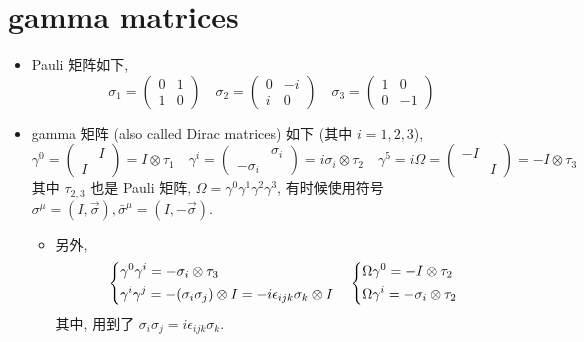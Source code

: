 \section{gamma matrices}
\begin{itemize}
	\item Pauli 矩阵如下,
	\begin{equation}
		\sigma_1 = \begin{pmatrix}
			0 & 1 \\
			1 & 0
		\end{pmatrix} \quad \sigma_2 = \begin{pmatrix}
			0 & - i \\
			i & 0
		\end{pmatrix} \quad \sigma_3 = \begin{pmatrix}
			1 & 0 \\
			0 & - 1
		\end{pmatrix}
	\end{equation}
	
	\item gamma 矩阵 (also called Dirac matrices) 如下 (其中 $i = 1, 2, 3$),
	\begin{equation}
		\gamma^0 = \begin{pmatrix}
			& I \\
			I &
		\end{pmatrix} = I \otimes \tau_1 \quad \gamma^i = \begin{pmatrix}
			& \sigma_i \\
			- \sigma_i &
		\end{pmatrix} = i \sigma_i \otimes \tau_2 \quad \gamma^5 = i \Omega = \begin{pmatrix}
			- I & \\
			& I
		\end{pmatrix} = - I \otimes \tau_3
	\end{equation}
	其中 $\tau_{2, 3}$ 也是 Pauli 矩阵, $\Omega = \gamma^0 \gamma^1 \gamma^2 \gamma^3$, 有时候使用符号 $\sigma^\mu = (I, \vec{\sigma}), \bar{\sigma}^\mu = (I, - \vec{\sigma})$.
	\begin{itemize}
		\item 另外,
		\begin{equation}
			\begin{dcases}
				\gamma^0 \gamma^i = - \sigma_i \otimes \tau_3 \\
				\gamma^i \gamma^j = - (\sigma_i \sigma_j) \otimes I = - i \epsilon_{i j k} \sigma_k \otimes I
			\end{dcases} \quad \begin{dcases}
				\Omega \gamma^0 = - I \otimes \tau_2 \\
				\Omega \gamma^i = - \sigma_i \otimes \tau_2
			\end{dcases}
		\end{equation}
		其中, 用到了 $\sigma_i \sigma_j = i \epsilon_{i j k} \sigma_k$.
	\end{itemize}
	

\end{itemize}
